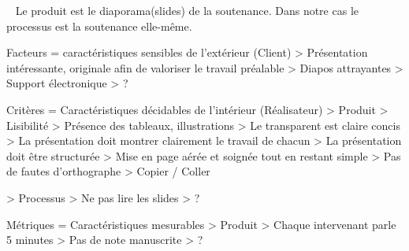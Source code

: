\documentclass[a4paper, 12pt]{article}
\begin{document}
	\maketitle
~\newline
Le produit est le diaporama(slides) de la soutenance.
Dans notre cas le processus est la soutenance elle-même.

Facteurs = caractéristiques sensibles de l'extérieur (Client)
	> Présentation intéressante, originale afin de valoriser le travail préalable 
	> Diapos attrayantes
	> Support électronique
	> ? %

Critères  = Caractéristiques décidables de l'intérieur (Réalisateur)
> Produit 
	> Lisibilité 
	> Présence des tableaux, illustrations
	> Le transparent est claire concis 
	> La présentation doit montrer clairement le travail de chacun
	> La présentation doit être structurée
	> Mise en page aérée et soignée tout en restant simple
	> Pas de fautes d'orthographe
	> Copier / Coller
	
> Processus	
	> Ne pas lire les slides
	> ? %

Métriques = Caractéristiques mesurables 
> Produit
	> Chaque intervenant parle 5 minutes
	> Pas de note manuscrite
	> ? %
\end{document}
